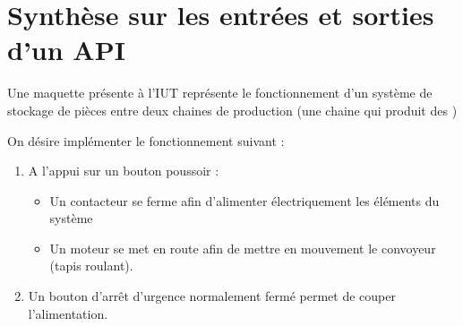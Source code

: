 \documentclass[11pt]{article}
\begin{document}
\pagebreak
\section{Synthèse sur les entrées et sorties d'un API}

Une maquette présente à l'IUT représente le fonctionnement d'un système de stockage de pièces entre deux chaines de production (une chaine qui produit des )

\begin{UPSTIactivite}
	On désire implémenter le fonctionnement suivant :
	\begin{enumerate}
		\item A l'appui sur un bouton poussoir :
		      \begin{itemize}
			      \item Un contacteur se ferme afin d'alimenter électriquement les éléments du système
			      \item Un moteur se met en route afin de mettre en mouvement le convoyeur (tapis roulant).
		      \end{itemize}
		\item Un bouton d'arrêt d'urgence normalement fermé permet de couper l'alimentation.
	\end{enumerate}

	\vspace{2cm}
	\vspace{11cm}
\end{UPSTIactivite}
\end{document}
